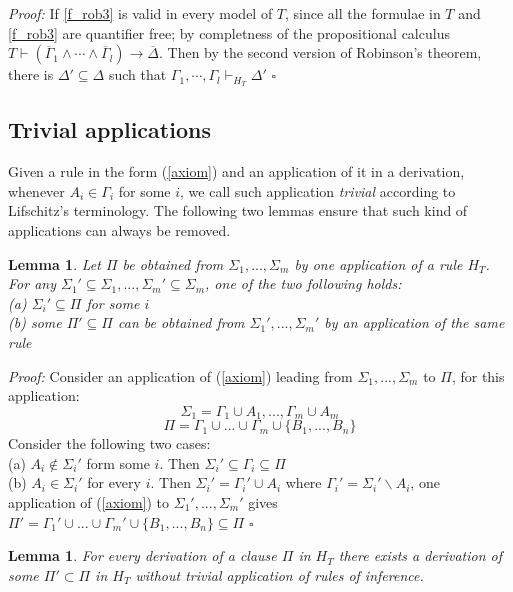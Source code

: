 \documentclass[a4paper,12pt,oneside]{book}
\newtheorem{lemma}[theorem]{Lemma}
\newcommand*{\QED}{\hfill\ensuremath{\square}}
\let\e\wedge
\begin{document}
\textit{Proof:} If \ref{f_rob3} is valid in every model of $T$, since all the formulae in $T$ and \ref{f_rob3} are quantifier free; by completness of the propositional calculus $T\vdash (\overline{\Gamma}_1\e\cdots\e\overline{\Gamma}_l )\rightarrow\overline{\Delta}$. Then by the second version of Robinson's theorem, there is $\Delta' \subseteq \Delta$ such that $\Gamma_1, \cdots ,\Gamma_l \vdash_{H_T} \Delta'$ \QED

\newpage
\subsection*{Trivial applications}
	
Given a rule in the form (\ref{axiom}) and an application of it in a derivation, whenever $A_i \in \Gamma_i$ for some $i$, we call such application \textit{trivial} according to Lifschitz's terminology. The following two lemmas ensure that such kind of applications can always be removed.

\begin{lemma}\label{lemma1}
Let $\Pi$ be obtained from $\Sigma_1,...,\Sigma_m$ by one application of a rule $H_T$. For any $\Sigma_1' \subseteq \Sigma_1,...,\Sigma_m' \subseteq \Sigma_m  $, one of the two following holds:\\
(a) $\Sigma_i' \subseteq \Pi$ for some $i$\\
(b) some $\Pi '\subseteq\Pi$ can be obtained from $\Sigma_1 ',...,\Sigma_m '$ by an application of the same rule
\end{lemma}

\emph{Proof:} Consider an application of (\ref{axiom}) leading from  $\Sigma_1,...,\Sigma_m$ to $\Pi$, for this application:
$$\Sigma_1=\Gamma_1\cup A_1,...,\Gamma_m\cup A_m  $$
$$\Pi=\Gamma_1\cup ...\cup\Gamma_m\cup\{B_1,...,B_n\}$$
Consider the following two cases:\\
(a) $A_i \notin \Sigma_i '$ form some $i$. Then $\Sigma_i '\subseteq\Gamma_i\subseteq\Pi$
\\(b) $A_i \in \Sigma_i '$ for every $i$. Then $\Sigma_i '=\Gamma_i ' \cup A_i$ where $\Gamma_i '=\Sigma_i '\backslash A_i $, one application of (\ref{axiom}) to 
$\Sigma_1 ',...,\Sigma_m '$ gives 
$\Pi '=\Gamma_1 '\cup ...\cup\Gamma_m '\cup\{B_1,...,B_n\}\subseteq\Pi$
\QED

\newpage
\begin{lemma}
For every derivation of a clause $\Pi$ in $H_T$ there exists a derivation of some $\Pi '\subset\Pi $ in $H_T$ without trivial application of rules of inference.
\end{lemma}
\end{document}
